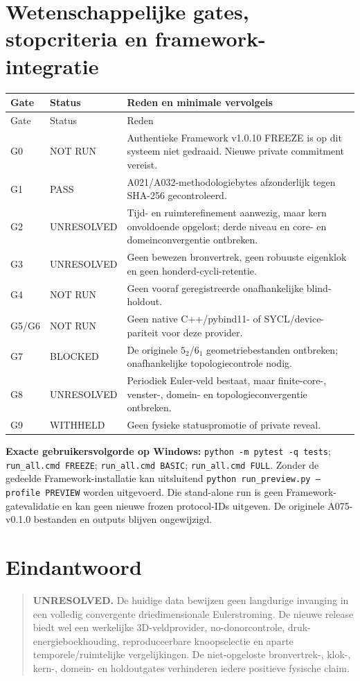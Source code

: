\documentclass[10pt,a4paper]{article}
\begin{document}
\section{Wetenschappelijke gates, stopcriteria en framework-integratie}
\begin{longtable}{@{}p{10mm}p{25mm}p{111mm}@{}}\toprule
Gate & Status & Reden en minimale vervolgeis\\\midrule\endfirsthead\toprule Gate & Status & Reden\\\midrule\endhead
G0 & NOT RUN & Authentieke Framework v1.0.10 FREEZE is op dit systeem niet gedraaid. Nieuwe private commitment vereist.\\
G1 & PASS & A021/A032-methodologiebytes afzonderlijk tegen SHA-256 gecontroleerd.\\
G2 & UNRESOLVED & Tijd- en ruimterefinement aanwezig, maar kern onvoldoende opgelost; derde niveau en core- en domeinconvergentie ontbreken.\\
G3 & UNRESOLVED & Geen bewezen bronvertrek, geen robuuste eigenklok en geen honderd-cycli-retentie.\\
G4 & NOT RUN & Geen vooraf geregistreerde onafhankelijke blind-holdout.\\
G5/G6 & NOT RUN & Geen native C++/pybind11- of SYCL/device-pariteit voor deze provider.\\
G7 & BLOCKED & De originele $5_2$/$6_1$ geometriebestanden ontbreken; onafhankelijke topologiecontrole nodig.\\
G8 & UNRESOLVED & Periodiek Euler-veld bestaat, maar finite-core-, venster-, domein- en topologieconvergentie ontbreken.\\
G9 & WITHHELD & Geen fysieke statuspromotie of private reveal.\\\bottomrule\end{longtable}
\noindent\textbf{Exacte gebruikersvolgorde op Windows:} \texttt{python -m pytest -q tests}; \texttt{run\_all.cmd FREEZE}; \texttt{run\_all.cmd BASIC}; \texttt{run\_all.cmd FULL}. Zonder de gedeelde Framework-installatie kan uitsluitend \texttt{python run\_preview.py --profile PREVIEW} worden uitgevoerd. Die stand-alone run is geen Framework-gatevalidatie en kan geen nieuwe frozen protocol-IDs uitgeven. De originele A075-v0.1.0 bestanden en outputs blijven ongewijzigd.
\section{Eindantwoord}
\begin{quote}\textbf{UNRESOLVED.} De huidige data bewijzen geen langdurige invanging in een volledig convergente driedimensionale Eulerstroming. De nieuwe release biedt wel een werkelijke 3D-veldprovider, no-donorcontrole, druk-energieboekhouding, reproduceerbare knoopselectie en aparte temporele/ruimtelijke vergelijkingen. De niet-opgeloste bronvertrek-, klok-, kern-, domein- en holdoutgates verhinderen iedere positieve fysische claim.\end{quote}
\end{document}
